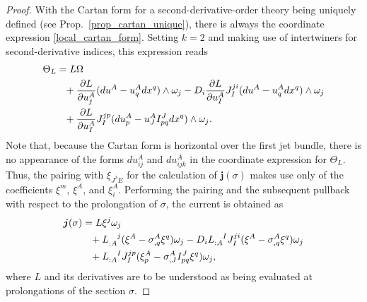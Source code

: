 \begin{proof}
  With the Cartan form for a second-derivative-order theory being uniquely defined (see Prop.\ \ref{prop_cartan_unique}), there is always the coordinate expression \eqref{local_cartan_form}. Setting $k=2$ and making use of intertwiners for second-derivative indices, this expression reads
  \begin{equation}
    \begin{aligned}
      \Theta_L &{} = L\Omega \\
               &{} \hphantom{=} + \frac{\partial L}{\partial u^A_j}(du^A - u^A_q dx^q)\wedge\omega_j - D_i \frac{\partial L}{\partial u^A_I} J_I^{ji} (du^A-u^A_qdx^q)\wedge\omega_j \\
               &{} \hphantom{=} + \frac{\partial L}{\partial u^A_I} J_I^{jp} (du^A_p - u^A_J I_{pq}^J dx^q)\wedge\omega_j.
  \end{aligned}
  \end{equation}
  Note that, because the Cartan form is horizontal over the first jet bundle, there is no appearance of the forms $du^A_{ij}$ and $du^A_{ijk}$ in the coordinate expression for $\Theta_L$. Thus, the pairing with $\xi_{J^3E}$ for the calculation of $\boldsymbol{j}(\sigma)$ makes use only of the coefficients $\xi^m$, $\xi^A$, and $\xi^A_i$. Performing the pairing and the subsequent pullback with respect to the prolongation of $\sigma$, the current is obtained as
  \begin{equation}
    \begin{aligned}
      \boldsymbol{j}(\sigma) &{} = L \xi^j \omega_j \\
                             &{} \hphantom{=} + L_{:A}^{\hphantom{:A}j} (\xi^A - \sigma^A_{,q} \xi^q) \omega_j - D_i L_{:A}^{\hphantom{:A}I} J_I^{ji} (\xi^A - \sigma^A_{,q} \xi^q) \omega_j \\
                             &{} \hphantom{=} + L_{:A}^{\hphantom{:A}I} J_I^{jp} (\xi^A_p - \sigma^A_{,J}I^J_{pq}\xi^q) \omega_j,
    \end{aligned}
  \end{equation}
  where $L$ and its derivatives are to be understood as being evaluated at prolongations of the section $\sigma$.


\end{proof}
